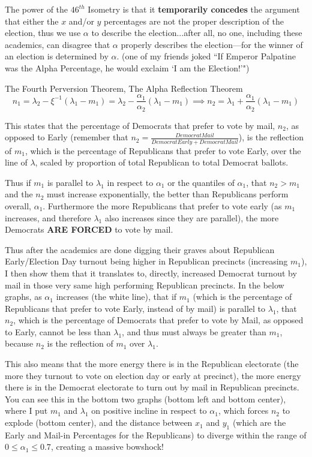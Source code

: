 The power of the $46^{th}$ Isometry is that it \textbf{temporarily concedes} the argument that either the $x$ and/or $y$ percentages are not the proper description of the election, thus we use $\alpha$ to describe the election...after all, no one, including these academics, can disagree that $\alpha$ properly describes the election---for the winner of an election is determined by $\alpha$. (one of my friends joked ``If Emperor Palpatine was the Alpha Percentage, he would exclaim `I am the Election!'")

\begin{theorem}{The Fourth Perversion Theorem, The Alpha Reflection Theorem}
$$n_{1}=\lambda_{2}-\xi^{-1}(\lambda_1-m_{1})=\lambda_{2}-\frac{\alpha_{1}}{\alpha_{2}}(\lambda_1-m_{1}) \implies n_{2}=\lambda_{1}+\frac{\alpha_{1}}{\alpha_{2}}(\lambda_1-m_{1})$$

This states that the percentage of Democrats that prefer to vote by mail, $n_2$, as opposed to Early (remember that $n_{2}=\frac{Democrat Mail}{Democrat Early+Democrat Mail}$), is the reflection of $m_{1}$, which is the percentage of Republicans that prefer to vote Early, over the line of $\lambda$, scaled by proportion of total Republican to total Democrat ballots.

Thus if $m_{1}$ is parallel to $\lambda_{1}$ in respect to $\alpha_{1}$ or the quantiles of $\alpha_{1}$,  that $n_{2}>m_{1}$ and the $n_{2}$ must increase exponentially, the better than Republicans perform overall, $\alpha_{1}$. Furthermore the more Republicans that prefer to vote early (as $m_{1}$ increases, and therefore $\lambda_{1}$ also increases since they are parallel), the more Democrats \textbf{ARE FORCED} to vote by mail.
\end{theorem}
Thus after the academics are done digging their graves about Republican Early/Election Day turnout being higher in Republican precincts (increasing $m_{1}$), I then show them that it translates to, directly, increased Democrat turnout by mail in those very same high performing Republican precincts.
\newpage
In the below graphs, as $\alpha_{1}$ increases (the white line), that if $m_{1}$ (which is the percentage of Republicans that prefer to vote Early, instead of by mail) is parallel to $\lambda_{1}$, that $n_{2}$, which is the percentage of Democrats that prefer to vote by Mail, as opposed to Early, cannot be less than $\lambda_{1}$, and thus must always be greater than $m_{1}$, because $n_{2}$ is the reflection of $m_{1}$ over $\lambda_{1}$.

This also means that the more energy there is in the Republican electorate (the more they turnout to vote on election day or early at precinct), the more energy there is in the Democrat electorate to turn out by mail in Republican precincts. You can see this in the bottom two graphs (bottom left and bottom center), where I put $m_{1}$ and $\lambda_{1}$ on positive incline in respect to $\alpha_{1}$, which forces $n_{2}$ to explode (bottom center), and the distance between $x_{1}$ and $y_{1}$ (which are the Early and Mail-in Percentages for the Republicans) to diverge within the range of $0 \le \alpha_{1} \le 0.7$, creating a massive bowshock!

